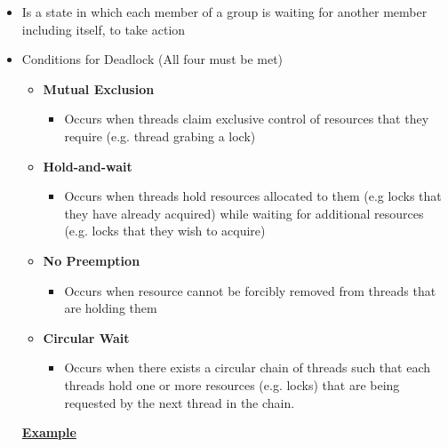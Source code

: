 \documentclass[12pt]{article}
\begin{document}
\begin{enumerate}[1.]
\begin{enumerate}[a)]
\begin{itemize}
            \begin{itemize}
                \item Is a state in which each member of a group is waiting for
                another member including itself, to take action
                \item Conditions for Deadlock (All four must be met)

                \begin{itemize}
                    \item \textbf{Mutual Exclusion}
                    \begin{itemize}
                        \item Occurs when threads claim exclusive control of resources that
                        they require (e.g. thread grabing a lock)
                    \end{itemize}
                    \item \textbf{Hold-and-wait}
                    \begin{itemize}
                        \item Occurs when threads hold resources allocated to them (e.g locks that they have already acquired)
                        while waiting for additional resources (e.g. locks that they wish to acquire)
                    \end{itemize}

                    \item \textbf{No Preemption}
                    \begin{itemize}
                        \item Occurs when resource cannot be forcibly removed from threads that are holding them
                    \end{itemize}
                    \item \textbf{Circular Wait}
                    \begin{itemize}
                        \item Occurs when there exists a circular chain of threads such that
                        each threads hold one or more resources (e.g. locks) that are being
                        requested by the next thread in the chain.
                    \end{itemize}
                \end{itemize}

                \bigskip

                \underline{\textbf{Example}}


\end{itemize}
\end{itemize}
\end{enumerate}
\end{enumerate}
\end{document}
